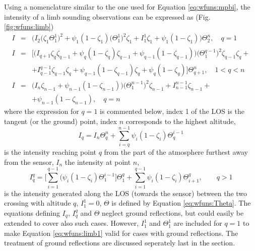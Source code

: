  Using a nomenclature similar to the one used for Equation
 \ref{eq:wfuns:mpbi}, the intensity of a limb sounding
 observations can be expressed as (Fig. \ref{fig:wfuns:limb})
 \begin{eqnarray}
   I & = & \Big(I_2 \Big( \zeta_1\Theta^1_1 \Big)^2 + \psi_1(1-\zeta_1)
            \Big( \Theta^1_1 \Big)^2 \zeta_1+
            I_1^1\zeta_1+\psi_1(1-\zeta_1) \Big)\Theta^n_{2}, \quad q=1 
        \nonumber \\
   I & = & \Big[\Big(I_{q+1}\zeta_q\zeta_{q-1} +\psi_q(1-\zeta_q)\zeta_{q-1} + 
           \psi_{q-1}(1-\zeta_{q-1})\Big)\Big(\Theta^{q-1}_{1}\Big)^2
           \zeta_{q-1}\zeta_q + \nonumber \\
      & & + I_{q-1}^{q-1}\zeta_{q-1}\zeta_q + \psi_{q-1}(1-\zeta_{q-1})
           \zeta_q + \psi_q(1-\zeta_q) \Big] \Theta^n_{q+1}, \quad 1<q<n
  \label{eq:wfuns:limb1}  \\
   I & = & \Big(I_n\zeta_{n-1}+\psi_{n-1}(1-\zeta_{n-1})\Big)\Big
           (\Theta^{n-1}_{1}\Big)^2\zeta_{n-1} + I_{n-1}^{n-1}\zeta_{n-1} +
             \nonumber \\
      & &  +   \psi_{n-1}(1-\zeta_{n-1}), \quad q=n \nonumber
 \end{eqnarray}
 where the expression for $q=1$ is commented below, index 1 of the LOS
 is the tangent (or the ground) point, index $n$ corresponds to the
 highest altitude,
 \begin{equation}
   I_q = I_n \Theta^{n}_{q} + \sum_{i=q}^{n-1}\psi_i(1-\zeta_i) 
             \Theta_{q}^{i-1}
  \label{eq:wfuns:iqq}
 \end{equation}
 is the intensity reaching point $q$ from the part of the
 atmosphere furthest away from the sensor, $I_n$ the intensity at point $n$,
 \begin{equation}
   I_q^q = \Big[ \sum_{i=1}^{q-1}(\psi_i(1-\zeta_i)\Theta_{1}^{i-1}\Big]
             \Theta_{1}^{q} + \sum_{i=1}^{q-1}\psi_i(1-\zeta_i)
            \Theta_{i+1}^{q}, \qquad q>1
 \end{equation}
 is the intensity generated along the LOS (towards the sensor) between
 the two crossing with altitude $q$, $I_1^1=0$, $\Theta$ is defined by
 Equation \ref{eq:wfuns:Theta}. The equations defining $I_q$, $I_q^q$
 and $\Theta$ neglect ground reflections, but could easily be extended
 to cover also such cases. However, $I_1^1$ and $\Theta_1^1$ are
 included for $q=1$ to make Equation \ref{eq:wfuns:limb1} valid for
 cases with ground reflections. The treatment of ground reflections
 are discussed seperately last in the section.

